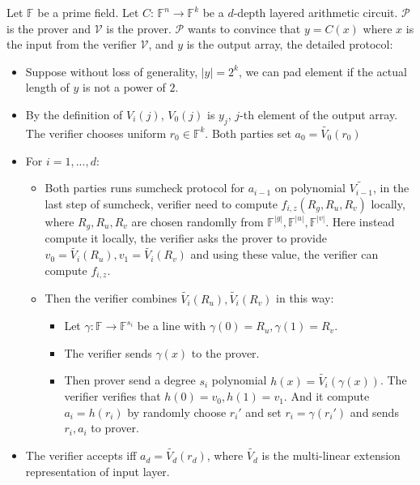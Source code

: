 \begin{protocol}
	\label{protocol::CMT}
	Let $\mathbb{F}$ be a prime field. Let $C$: $\mathbb{F}^n\rightarrow \mathbb{F}^k$ be a $d$-depth layered arithmetic circuit. $\mathcal{P}$ is the prover and $\mathcal{V}$ is the prover. $\mathcal{P}$ wants to convince that $y=C(x)$ where $x$ is the input from the verifier $\mathcal{V}$, and $y$ is the output array, the detailed protocol:

	\begin{itemize}
		\item Suppose without loss of generality, $|y|=2^k$, we can pad element if the actual length of $y$ is not a power of $2$.
		\item By the definition of $V_i(j)$, $V_0(j)$ is $y_j$, $j$-th element of the output array. The verifier chooses uniform $r_0 \in \mathbb{F}^k$. Both parties set $a_0=\tilde{V_0}(r_0)$
		\item For $i=1,...,d$:
		\begin{itemize}
			\item Both parties runs sumcheck protocol for $a_{i-1}$ on polynomial $\tilde{V_{i-1}}$, in the last step of sumcheck, verifier need to compute $f_{i,z}(R_{g}, R_{u}, R_{v})$ locally, where $R_{g}, R_{u}, R_{v}$ are chosen randomlly from $\mathbb{F}^{|g|},\mathbb{F}^{|u|},\mathbb{F}^{|v|}$. Here instead compute it locally, the verifier asks the prover to provide $v_0=\tilde{V_{i}}(R_{u}), v_1=\tilde{V_{i}}(R_{v})$ and using these value, the verifier can compute $f_{i,z}$.
			\item Then the verifier combines $\tilde{V_{i}}(R_{u}), \tilde{V_{i}}(R_{v})$ in this way: 
			\begin{itemize}
				\item Let $\gamma: \mathbb{F} \rightarrow \mathbb{F}^{s_i}$ be a line with $\gamma(0)=R_{u}, \gamma(1)=R_{v}$. 
				\item The verifier sends $\gamma(x)$ to the prover. 
				\item Then prover send a degree $s_i$ polynomial $h(x)=\tilde{V_{i}}(\gamma(x))$. The verifier verifies that $h(0)=v_0, h(1)=v_1$. And it compute $a_i=h(r_i)$ by randomly choose $r_i'$ and set $r_i=\gamma(r_i')$ and sends $r_i, a_i$ to prover.
			\end{itemize}
		\end{itemize}
		\item The verifier accepts iff $a_d = \tilde{V_d}(r_d)$, where $\tilde{V_d}$ is the multi-linear extension representation of input layer.
	\end{itemize}
\end{protocol}

